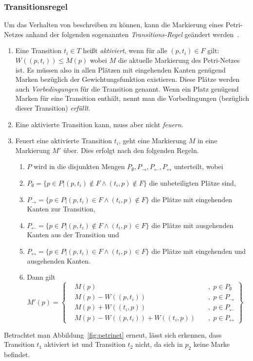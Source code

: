 \subsubsection{Transitionsregel} Um das Verhalten von  beschreiben zu können, kann die Markierung eines Petri-Netzes anhand der folgenden sogenannten \emph{Transitions-Regel} geändert werden~\cite{Murata1989}.
\begin{enumerate}
	\item Eine Transition $t_i \in T$ heißt \emph{aktiviert}, wenn für alle $(p,t_i) \in F $ gilt: $ W((p,t_i)) \leq M(p)$ wobei $M$ die aktuelle Markierung des Petri-Netzes ist. Es müssen also in allen Plätzen mit eingehenden Kanten genügend Marken bezüglich der Gewichtungsfunktion existieren. Diese Plätze werden auch \emph{Vorbedingungen} für die Transition genannt. Wenn ein Platz genügend Marken für eine Transition enthält, nennt man die Vorbedingungen (bezüglich dieser Transition) \emph{erfüllt}.
	\item Eine aktivierte Transition kann, muss aber nicht \emph{feuern}.
	\item Feuert eine aktivierte Transition $t_i$, geht eine Markierung $M$ in eine Markierung $M'$ über. Dies erfolgt nach den folgenden Regeln.
	\begin{enumerate}
		\item $P$ wird in die disjunkten Mengen $P_\emptyset, P_\rightarrow, P_\leftarrow, P_\leftrightarrow$ unterteilt, wobei 
		\item $P_\emptyset = \{p \in P | (p,t_i) \notin F \land (t_i,p) \notin F\}$ die unbeteiligten Plätze sind,
		\item $P_\rightarrow = \{p \in P | (p,t_i) \in F \land (t_i,p) \notin F\}$ die Plätze mit eingehenden Kanten zur Transition,
		\item $P_\leftarrow = \{p \in P | (p,t_i) \notin F \land (t_i,p) \in F\}$ die Plätze mit ausgehenden Kanten aus der Transition und 
		\item $P_\leftrightarrow = \{p \in P | (p,t_i) \in F \land (t_i,p) \in F\}$ die Plätze mit eingehenden und ausgehenden Kanten.
		\item Dann gilt $
			M'(p) = \left\{ 
				\begin{aligned}
					& M(p) && \; , \; p \in P_\emptyset\\
					& M(p)-W((p,t_i)) && \; , \; p \in P_\rightarrow\\
					&M(p)+W((t_i,p)) && \; , \; p \in P_\leftarrow\\
					& M(p)-W((p,t_i))+W((t_i,p)) && \; , \; p \in P_\leftrightarrow
				\end{aligned}
				\right\}
		$
	\end{enumerate}
\end{enumerate}
Betrachtet man Abbildung~\ref{fig:petrinet} erneut, lässt sich erkennen, dass Transition $t_1$ aktiviert ist und Transition $t_2$ nicht, da sich in $p_2$ keine Marke befindet.

